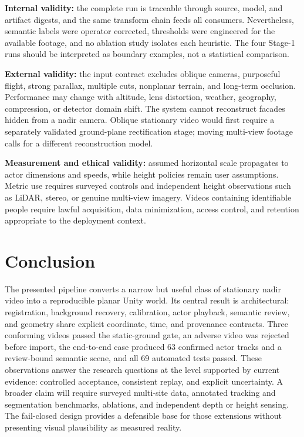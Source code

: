 \documentclass[letterpaper,conference]{IEEEtran}
\begin{document}
\textbf{Internal validity:} the complete run is traceable through source, model, and artifact digests, and the same transform chain feeds all consumers. Nevertheless, semantic labels were operator corrected, thresholds were engineered for the available footage, and no ablation study isolates each heuristic. The four Stage-1 runs should be interpreted as boundary examples, not a statistical comparison.

\textbf{External validity:} the input contract excludes oblique cameras, purposeful flight, strong parallax, multiple cuts, nonplanar terrain, and long-term occlusion. Performance may change with altitude, lens distortion, weather, geography, compression, or detector domain shift. The system cannot reconstruct facades hidden from a nadir camera. Oblique stationary video would first require a separately validated ground-plane rectification stage; moving multi-view footage calls for a different reconstruction model.

\textbf{Measurement and ethical validity:} assumed horizontal scale propagates to actor dimensions and speeds, while height policies remain user assumptions. Metric use requires surveyed controls and independent height observations such as LiDAR, stereo, or genuine multi-view imagery. Videos containing identifiable people require lawful acquisition, data minimization, access control, and retention appropriate to the deployment context.

\section{Conclusion}
The presented pipeline converts a narrow but useful class of stationary nadir video into a reproducible planar Unity world. Its central result is architectural: registration, background recovery, calibration, actor playback, semantic review, and geometry share explicit coordinate, time, and provenance contracts. Three conforming videos passed the static-ground gate, an adverse video was rejected before import, the end-to-end case produced 63 confirmed actor tracks and a review-bound semantic scene, and all 69 automated tests passed. These observations answer the research questions at the level supported by current evidence: controlled acceptance, consistent replay, and explicit uncertainty. A broader claim will require surveyed multi-site data, annotated tracking and segmentation benchmarks, ablations, and independent depth or height sensing. The fail-closed design provides a defensible base for those extensions without presenting visual plausibility as measured reality.
\end{document}
